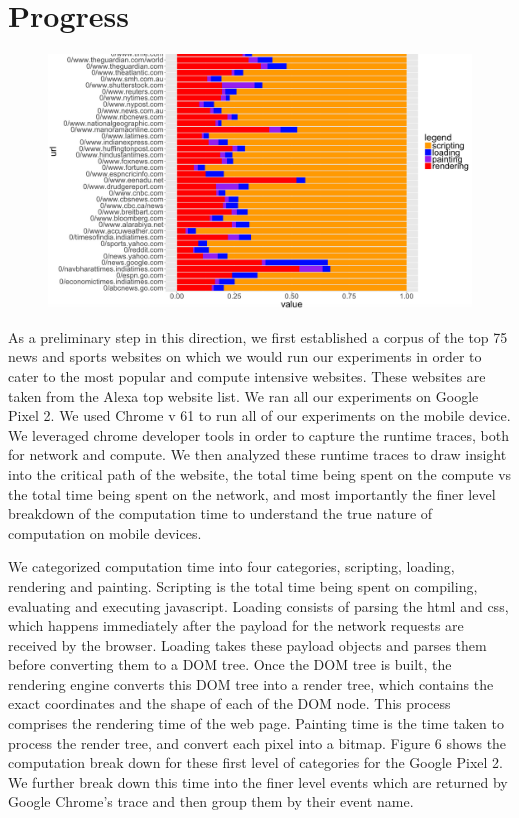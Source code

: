 \section{Progress}
\label{sec:Progress}


\begin{figure}[t!]
\centering
\includegraphics[width=0.99\columnwidth, scale=2.0]{figs/comp_1.png}
\label{fig:act_p2}
\end{figure}

As a preliminary step in this direction, we first established a corpus of the top
75 news and sports websites on which we would run our experiments
in order to cater to the most popular and compute intensive websites. 
These websites are taken from the Alexa top website list.
We ran all our experiments on Google Pixel 2. We used Chrome v 61 to run all of our experiments on the mobile device. We leveraged chrome developer tools in order
to capture the runtime traces, both for network and compute. We then analyzed these runtime
traces to draw insight into the critical path of the website, the total time being spent on the 
compute vs the total time being spent on the network, and most importantly the finer
level breakdown of the computation time to understand the true nature of computation on mobile
devices. 

We categorized computation time into four categories, scripting, loading, rendering and
painting. Scripting is the total time being spent on
compiling, evaluating and executing javascript. Loading consists of parsing the html and css, which happens 
immediately after the payload for the network requests are received by the browser. Loading
takes these payload objects and parses them before converting them to a DOM tree. Once the DOM tree is built,
the rendering engine converts this DOM tree into a render tree, which contains the
exact coordinates and the shape of each of the DOM node. This process comprises the rendering time of the web page.
Painting time is the time taken to process the render tree, and convert
each pixel into a bitmap.
Figure 6 shows the computation break down for these first level of categories
for the Google Pixel 2. We further break down this time into the finer level events
which are returned by Google Chrome's trace and then group them by their event name.

